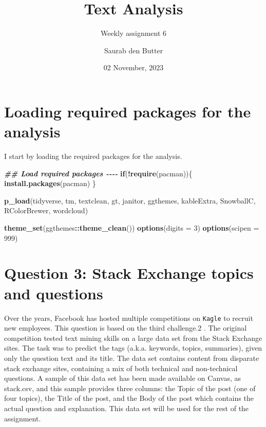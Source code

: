 \documentclass[
]{article}
\title{Text Analysis}
\subtitle{Weekly assignment 6}
\author{Saurab den Butter}
\date{02 November, 2023}
\newenvironment{Shaded}{\begin{snugshade}}{\end{snugshade}}
\newcommand{\AttributeTok}[1]{\textcolor[rgb]{0.13,0.29,0.53}{#1}}
\newcommand{\ControlFlowTok}[1]{\textcolor[rgb]{0.13,0.29,0.53}{\textbf{#1}}}
\newcommand{\DecValTok}[1]{\textcolor[rgb]{0.00,0.00,0.81}{#1}}
\newcommand{\DocumentationTok}[1]{\textcolor[rgb]{0.56,0.35,0.01}{\textbf{\textit{#1}}}}
\newcommand{\FunctionTok}[1]{\textcolor[rgb]{0.13,0.29,0.53}{\textbf{#1}}}
\newcommand{\NormalTok}[1]{#1}
\newcommand{\SpecialCharTok}[1]{\textcolor[rgb]{0.81,0.36,0.00}{\textbf{#1}}}
\newcommand{\StringTok}[1]{\textcolor[rgb]{0.31,0.60,0.02}{#1}}
\begin{document}
\maketitle

{
\setcounter{tocdepth}{1}
\tableofcontents
}
\hypertarget{loading-required-packages-for-the-analysis}{%
\section{\texorpdfstring{\textbf{Loading required packages for the
analysis}}{Loading required packages for the analysis}}\label{loading-required-packages-for-the-analysis}}

I start by loading the required packages for the analysis.

\begin{Shaded}
\begin{Highlighting}[]
\DocumentationTok{\#\# Load required packages {-}{-}{-}{-}}
\ControlFlowTok{if}\NormalTok{(}\SpecialCharTok{!}\FunctionTok{require}\NormalTok{(pacman))\{}
        \FunctionTok{install.packages}\NormalTok{(}\StringTok{\textquotesingle{}pacman\textquotesingle{}}\NormalTok{)}
\NormalTok{\}}

\FunctionTok{p\_load}\NormalTok{(tidyverse, tm, textclean, }
\NormalTok{       gt, janitor, ggthemes,}
\NormalTok{       kableExtra, SnowballC,}
\NormalTok{       RColorBrewer, wordcloud)}

\FunctionTok{theme\_set}\NormalTok{(ggthemes}\SpecialCharTok{::}\FunctionTok{theme\_clean}\NormalTok{())}
\FunctionTok{options}\NormalTok{(}\AttributeTok{digits =} \DecValTok{3}\NormalTok{)}
\FunctionTok{options}\NormalTok{(}\AttributeTok{scipen =} \DecValTok{999}\NormalTok{)}
\end{Highlighting}
\end{Shaded}

\hypertarget{question-3-stack-exchange-topics-and-questions}{%
\section{\texorpdfstring{\textbf{Question 3: Stack Exchange topics and
questions}}{Question 3: Stack Exchange topics and questions}}\label{question-3-stack-exchange-topics-and-questions}}

Over the years, Facebook has hosted multiple competitions on
\texttt{Kagle} to recruit new employees. This question is based on the
third challenge.2 . The original competition tested text mining skills
on a large data set from the Stack Exchange sites. The task was to
predict the tags (a.k.a. keywords, topics, summaries), given only the
question text and its title. The data set contains content from
disparate stack exchange sites, containing a mix of both technical and
non-technical questions. A sample of this data set has been made
available on Canvas, as stack.csv, and this sample provides three
columns: the Topic of the post (one of four topics), the Title of the
post, and the Body of the post which contains the actual question and
explanation. This data set will be used for the rest of the assignment.
\end{document}
